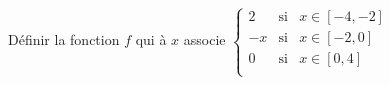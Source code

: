 Définir la fonction $f$ qui à $x$ associe $\left\{\begin{array}{rcl}
							     2 & \mathrm{si} & x \in [-4,-2]\\
							    -x & \mathrm{si} & x \in [-2,0]\\
							      0 & \mathrm{si} & x \in [0,4]\\
							      \end{array} \right.$